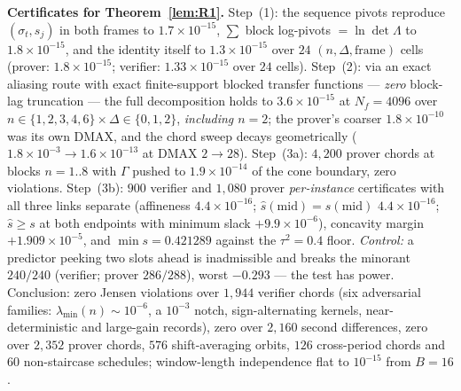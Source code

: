 \documentclass[11pt]{article}
\theoremstyle{definition}
\theoremstyle{remark}
\begin{document}
\noindent\textbf{Certificates for Theorem~\ref{lem:R1}.} Step~(1): the
sequence pivots reproduce $(\sigma_t,s_j)$ in both frames to
$1.7\times10^{-15}$, $\sum$ block log-pivots $=\ln\det\Lambda$ to
$1.8\times10^{-15}$, and the identity itself to $1.3\times10^{-15}$
over $24$ $(n,\Delta,\text{frame})$ cells (prover: $1.8\times10^{-15}$;
verifier: $1.33\times10^{-15}$ over $24$ cells). Step~(2): via an exact
aliasing route with exact finite-support blocked transfer functions ---
\emph{zero} block-lag truncation --- the full decomposition holds to
$3.6\times10^{-15}$ at $N_f=4096$ over $n\in\{1,2,3,4,6\}\times
\Delta\in\{0,1,2\}$, \emph{including $n=2$}; the prover's coarser
$1.8\times10^{-10}$ was its own DMAX, and the chord sweep decays
geometrically ($1.8\times10^{-3}\to1.6\times10^{-13}$ at DMAX
$2\to28$). Step~(3a): $4{,}200$ prover chords at blocks $n=1..8$ with
$\Gamma$ pushed to $1.9\times10^{-14}$ of the cone boundary, zero
violations. Step~(3b): $900$ verifier and $1{,}080$ prover
\emph{per-instance} certificates with all three links separate
(affineness $4.4\times10^{-16}$; $\hat s(\mathrm{mid})=s(\mathrm{mid})$
$4.4\times10^{-16}$; $\hat s\ge s$ at both endpoints with minimum slack
$+9.9\times10^{-6}$), concavity margin $+1.909\times10^{-5}$, and
$\min s=0.421289$ against the $\tau^2=0.4$ floor. \emph{Control:} a
predictor peeking two slots ahead is inadmissible and breaks the
minorant $240/240$ (verifier; prover $286/288$), worst $-0.293$ --- the
test has power. Conclusion: zero Jensen violations over $1{,}944$
verifier chords (six adversarial families: $\lambda_{\min}(n)\sim
10^{-6}$, a $10^{-3}$ notch, sign-alternating kernels,
near-deterministic and large-gain records), zero over $2{,}160$ second
differences, zero over $2{,}352$ prover chords, $576$ shift-averaging
orbits, $126$ cross-period chords and $60$ non-staircase schedules;
window-length independence flat to $10^{-15}$ from $B=16$.
\end{document}
